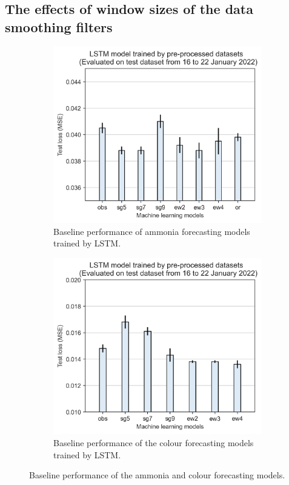 \subsection{The effects of window sizes of the data smoothing filters}

\begin{figure}[!ht]
  \centering
  \begin{subfigure}[t]{0.75\textwidth}
    \includegraphics[width=\linewidth]{imgs/results/feature-engineering/pre-processing-nh3-jan.png}
    \caption{Baseline performance of ammonia forecasting models trained by LSTM.} \label{fig:preprocessing-nh3}
  \end{subfigure}
  \hspace{2em}
  \begin{subfigure}[t]{0.75\textwidth}
    \includegraphics[width=\linewidth]{imgs/results/feature-engineering/pre-processing-colour.png}
    \caption{Baseline performance of the colour forecasting models trained by LSTM.} \label{fig:preprocessing-colour}
  \end{subfigure}
\caption{Baseline performance of the ammonia and colour forecasting models.} \label{fig:preprocessing-comparison}
\end{figure}

